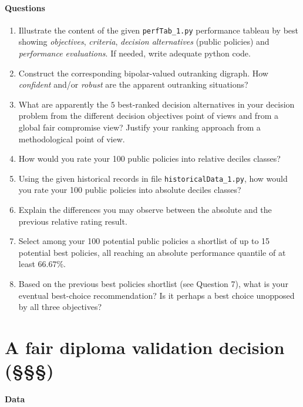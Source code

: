 \paragraph{\textbf{Questions}}

\begin{enumerate}
\item Illustrate the content of the given \texttt{perfTab\_1.py} performance tableau by best showing \emph{objectives}, \emph{criteria}, \emph{decision alternatives} (public policies) and \emph{performance evaluations}. If needed, write adequate python code.
\item Construct the corresponding bipolar-valued outranking digraph. How \emph{confident} and/or \emph{robust} are the apparent outranking situations?
\item What are apparently the $5$ best-ranked decision alternatives in your decision problem from the different decision objectives point of views and from a global fair compromise view? Justify your ranking approach from a methodological point of view.
\item How would you rate your 100 public policies into relative deciles classes?
\item Using the given historical records in file \texttt{historicalData\_1.py}, how would you rate your 100 public policies into absolute deciles classes? 
\item Explain the differences you may observe between the absolute and the previous relative rating result.
\item  Select among your 100 potential public policies a shortlist of up to 15 potential best policies, all reaching an absolute performance quantile of at least $66.67\%$.
\item Based on the previous best policies shortlist (see Question 7), what is your eventual best-choice recommendation? Is it perhaps a best choice unopposed by all three objectives?
\end{enumerate}

\section{A fair diploma validation decision (§§§)}
\label{sec:15.5}

\paragraph{\textbf{Data}}

